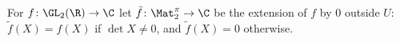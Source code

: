 For $f\colon\GL_2(\R)\to\C$ let $\tilde f\colon\Mat_2^{\pi}\to\C$ be the extension of $f$ by $0$ outside $U$: $\tilde f(X)=f(X)$ if $\det X\neq0$, and $\tilde f(X)=0$ otherwise.
